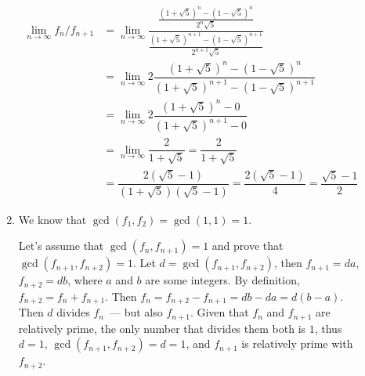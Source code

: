 \begin{description}
\begin{enumerate}
\begin{align*}
\lim_{n\to\infty} f_n / f_{n+1} &= 
\lim_{n\to\infty} \dfrac
{\frac{(1 + \sqrt 5)^n - (1 - \sqrt 5)^n} {2^n \sqrt 5}}
{\frac{(1 + \sqrt 5)^{n+1} - (1 - \sqrt 5)^{n+1}} {2^{n+1} \sqrt 5}} \\
&= \lim_{n\to\infty} 2 \dfrac{(1 + \sqrt 5)^n - (1 - \sqrt 5)^n}
{(1 + \sqrt 5)^{n+1} - (1 - \sqrt 5)^{n+1}} \\
&= \lim_{n\to\infty} 2 \dfrac{(1 + \sqrt 5)^n - 0} {(1 + \sqrt 5)^{n+1} - 0} \\
&= \lim_{n\to\infty} \dfrac{2} {1 + \sqrt 5} = \dfrac{2} {1 + \sqrt 5} \\
&= \dfrac{2 (\sqrt 5 - 1)} {(1 + \sqrt 5) (\sqrt 5 - 1)}
 = \dfrac{2 (\sqrt 5 - 1)} {4} = \dfrac{\sqrt 5 - 1} {2}
\end{align*}

\item We know that $\gcd(f_1, f_2) = \gcd(1, 1) = 1$.

Let's assume that $\gcd(f_n, f_{n+1}) = 1$ and prove that $\gcd(f_{n+1},
f_{n+2}) = 1$. Let $d = \gcd(f_{n+1}, f_{n+2})$, then $f_{n+1} = da$, $f_{n+2}
= db$, where $a$ and $b$ are some integers. By definition, $f_{n+2} = f_n +
f_{n+1}$. Then $f_n = f_{n+2} - f_{n+1} = db - da = d(b - a)$. Then $d$ divides
$f_n$~--- but also $f_{n+1}$. Given that $f_n$ and $f_{n+1}$ are relatively
prime, the only number that divides them both is $1$, thus $d = 1$,
$\gcd(f_{n+1}, f_{n+2}) = d = 1$, and $f_{n+1}$ is relatively prime with
$f_{n+2}$.

\end{enumerate}

\end{description}
